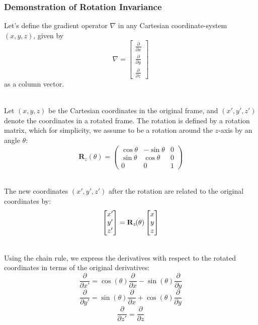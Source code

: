 \documentclass[main]{subfiles}
\begin{document}
\newpage
\subsubsection{Demonstration of Rotation Invariance}
\label{invariance}
Let's define the gradient operator $\nabla$ in any Cartesian  
coordinate-system $(x, y, z)$, given by 
\begin{equation}
\nabla = 
\begin{bmatrix} 
\frac{\partial}{\partial x} \\ 
\frac{\partial}{\partial y} \\
\frac{\partial}{\partial z}
\end{bmatrix}
\label{eq:nabla}
\end{equation}
as a column vector.

\noindent\\
Let \( (x, y, z) \) be the Cartesian coordinates in the original frame, 
and \( (x', y', z') \) denote the coordinates in a rotated frame. 
The rotation is defined by a rotation matrix, which for simplicity, 
we assume to be a rotation around the \( z \)-axis by an angle \( \theta \):
\[
\mathbf{R}_z(\theta) = 
\begin{pmatrix}
\cos \theta & -\sin \theta & 0 \\
\sin \theta & \cos \theta & 0 \\
0 & 0 & 1
\end{pmatrix}
\]

\noindent\\
The new coordinates $(x', y', z')$ after the rotation are related to 
the original coordinates by:
\[
\begin{bmatrix} 
x' \\ 
y' \\
z'
\end{bmatrix} 
= 
\mathbf{R}_z\mkern-2mu(\theta)
\begin{bmatrix} 
x \\ 
y \\
z
\end{bmatrix}
\]

\noindent\\
Using the chain rule, we express the derivatives with respect to the rotated coordinates 
in terms of the original derivatives: 
\[
\frac{\partial}{\partial x'} = \cos(\theta) \frac{\partial}{\partial x} 
- \sin(\theta) \frac{\partial}{\partial y}
\]
\[
\frac{\partial}{\partial y'} = \sin(\theta) \frac{\partial}{\partial x} 
+ \cos(\theta) \frac{\partial}{\partial y}
\]
\[
\frac{\partial}{\partial z'} = \frac{\partial}{\partial z}
\]
\end{document}
